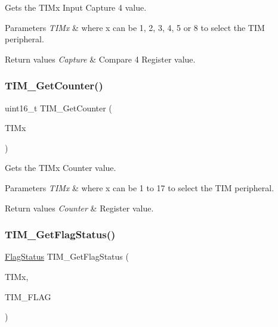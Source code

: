 Gets the T\+I\+Mx Input Capture 4 value. 


\begin{DoxyParams}{Parameters}
{\em T\+I\+Mx} & where x can be 1, 2, 3, 4, 5 or 8 to select the T\+IM peripheral. \\
\hline
\end{DoxyParams}

\begin{DoxyRetVals}{Return values}
{\em Capture} & Compare 4 Register value. \\
\hline
\end{DoxyRetVals}
\mbox{\label{group___t_i_m___exported___functions_gab6826b144ae70e206f51ae8af5318a93}} 
\subsubsection{\texorpdfstring{TIM\_GetCounter()}{TIM\_GetCounter()}}
{\footnotesize\ttfamily uint16\+\_\+t T\+I\+M\+\_\+\+Get\+Counter (\begin{DoxyParamCaption}\item[{\mbox{\hyperlink{struct_t_i_m___type_def}{T\+I\+M\+\_\+\+Type\+Def}} $\ast$}]{T\+I\+Mx }\end{DoxyParamCaption})}



Gets the T\+I\+Mx Counter value. 


\begin{DoxyParams}{Parameters}
{\em T\+I\+Mx} & where x can be 1 to 17 to select the T\+IM peripheral. \\
\hline
\end{DoxyParams}

\begin{DoxyRetVals}{Return values}
{\em Counter} & Register value. \\
\hline
\end{DoxyRetVals}
\mbox{\label{group___t_i_m___exported___functions_ga0adcbbd5e838ec8642e7a9b80075f41f}} 
\subsubsection{\texorpdfstring{TIM\_GetFlagStatus()}{TIM\_GetFlagStatus()}}
{\footnotesize\ttfamily \mbox{\hyperlink{group___exported__types_ga89136caac2e14c55151f527ac02daaff}{Flag\+Status}} T\+I\+M\+\_\+\+Get\+Flag\+Status (\begin{DoxyParamCaption}\item[{\mbox{\hyperlink{struct_t_i_m___type_def}{T\+I\+M\+\_\+\+Type\+Def}} $\ast$}]{T\+I\+Mx,  }\item[{uint16\+\_\+t}]{T\+I\+M\+\_\+\+F\+L\+AG }\end{DoxyParamCaption})}



